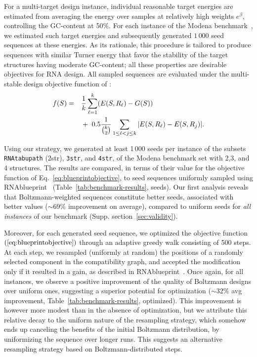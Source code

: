 \documentclass{bioinfo}
\newcommand{\Nuc}[1]{{\sf #1}}
\newcommand{\Cb}{\Nuc{C}}
\newcommand{\Gb}{\Nuc{G}}
\newcommand{\GCb}{\Gb\Cb}
\newcommand{\Software}[1]{{\ttfamily #1}}
\begin{document}
For a multi-target design instance, individual reasonable target energies are estimated from averaging the energy over samples at relatively high weights $e^{\beta}$, controlling the \GCb-content at 50\%. For each instance of the \Software{Modena} benchmark~\cite{Taneda2015}, we estimated such target energies and subsequently generated $1\,000$ seed sequences at these energies.
As its rationale, this procedure is tailored to produce sequences with similar Turner energy that favor the stability of the target structures having moderate \GCb-content; all these properties are desirable objectives for RNA design.
All sampled sequences are evaluated under the multi-stable design objective function of \cite{Hammer2017}:
\vspace{-12pt}
\begin{align}
  \label{eq:blueprintobjective}
    f(S)= \quad & \frac{1}{k} \sum_{\ell=1}^{k} (E(S, R_\ell) - G(S))\notag\\
   & +\ 0.5\frac{1}{\binom{k}{2}} \sum\limits_{1\leq\ell<j\leq k}|E(S,R_\ell) - E(S,R_j)|.
\end{align}

Using our strategy, we generated at least 1\,000 seeds per instance of
the subsets \texttt{RNAtabupath} (2str), \texttt{3str}, and \texttt{4str}, of
the \Software{Modena} benchmark set with 2,3, and 4 structures. The
results are compared, in terms of their value for the objective
function of Eq.~\eqref{eq:blueprintobjective}, to seed sequences
uniformly sampled using \Software{RNAblueprint}~\cite{Hammer2017}
(Table~\ref{tab:benchmark-results}, seeds). Our first analysis reveals
that Boltzmann-weighted sequences constitute better seeds, associated
with better values ($\sim\! 69\%$ improvement on average), compared to
uniform seeds for \emph{all instances} of our benchmark
(Supp. section~\ref{sec:validity}).

Moreover, for each generated seed sequence, we optimized the objective function $(\ref{eq:blueprintobjective})$ through an adaptive  greedy walk consisting of 500 steps. At each step, we resampled (uniformly at random) the positions of a randomly selected component in the compatibility graph, and accepted the modification only if it resulted in a gain, as described in \Software{RNAblueprint}~\cite{Hammer2017}.
%
Once again, for all instances, we observe a positive improvement of the quality of Boltzmann designs over uniform ones, suggesting a superior potential for optimization ($\sim 32\%$ avg improvement, Table~\ref{tab:benchmark-results}, optimized). This improvement is however more modest than in the absence of optimization, but we attribute this relative decay to the uniform nature of the resampling strategy, which somehow ends up canceling the benefits of the initial Boltzmann distribution, by uniformizing the sequence over longer runs. This suggests an alternative resampling strategy based on Boltzmann-distributed steps.
\end{document}
